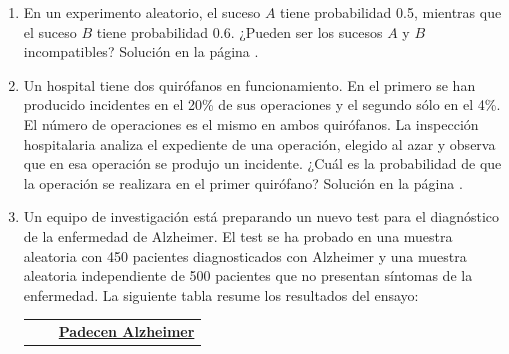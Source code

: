 \documentclass[10pt,a4paper]{article}\usepackage[]{graphicx}\usepackage[]{color}
\begin{document}
\begin{enumerate}
\item  \label{tut03:ejercicio27} 
En un experimento aleatorio, el suceso $A$ tiene probabilidad 0.5, mientras que el suceso $B$ tiene probabilidad 0.6. ¿Pueden ser los sucesos $A$ y $B$ incompatibles? 
Solución en la página \pageref{tut03:ejercicio27:sol}. 


\item  \label{tut03:ejercicio28} Un hospital tiene dos quirófanos en funcionamiento. En el primero se han producido incidentes en el 20\% de sus operaciones y el segundo sólo en el 4\%. El número de operaciones es el mismo en ambos quirófanos. La inspección hospitalaria analiza el expediente de una operación, elegido  al azar y observa que en esa operación se produjo un incidente. ¿Cuál es la probabilidad de que la operación se realizara en el primer quirófano?
Solución en la página \pageref{tut03:ejercicio28:sol}. 


\item  \label{tut03:ejercicio29} Un equipo de investigación está preparando un nuevo test para el diagnóstico de la enfermedad de Alzheimer. El test se ha probado en una muestra aleatoria con 450 pacientes diagnosticados con Alzheimer y una muestra aleatoria independiente de 500 pacientes que no presentan síntomas de la enfermedad. La siguiente tabla resume los resultados del ensayo:
\begin{center}
\begin{tabular}{llccc}
&&\multicolumn{3}{c}{\underline{\bf Padecen Alzheimer}}\\


\end{tabular}
\end{center}
\end{enumerate}
\end{document}
